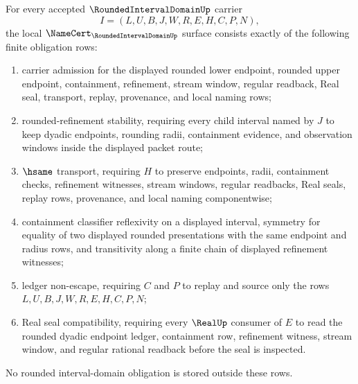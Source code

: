 \begin{theorem}
\label{thm:rounded-interval-domain-namecert-obligations}
For every accepted $\RoundedIntervalDomainUp$ carrier
$$
I=(L,U,B,J,W,R,E,H,C,P,N),
$$
the local $\NameCert_{\RoundedIntervalDomainUp}$ surface consists exactly of the following finite obligation rows:
\begin{enumerate}
\item carrier admission for the displayed rounded lower endpoint, rounded upper endpoint, containment, refinement, stream window, regular readback, Real seal, transport, replay, provenance, and local naming rows;
\item rounded-refinement stability, requiring every child interval named by $J$ to keep dyadic endpoints, rounding radii, containment evidence, and observation windows inside the displayed packet route;
\item $\hsame$ transport, requiring $H$ to preserve endpoints, radii, containment checks, refinement witnesses, stream windows, regular readbacks, Real seals, replay rows, provenance, and local naming componentwise;
\item containment classifier reflexivity on a displayed interval, symmetry for equality of two displayed rounded presentations with the same endpoint and radius rows, and transitivity along a finite chain of displayed refinement witnesses;
\item ledger non-escape, requiring $C$ and $P$ to replay and source only the rows $L,U,B,J,W,R,E,H,C,P,N$;
\item Real seal compatibility, requiring every $\RealUp$ consumer of $E$ to read the rounded dyadic endpoint ledger, containment row, refinement witness, stream window, and regular rational readback before the seal is inspected.
\end{enumerate}
No rounded interval-domain obligation is stored outside these rows.
\end{theorem}
